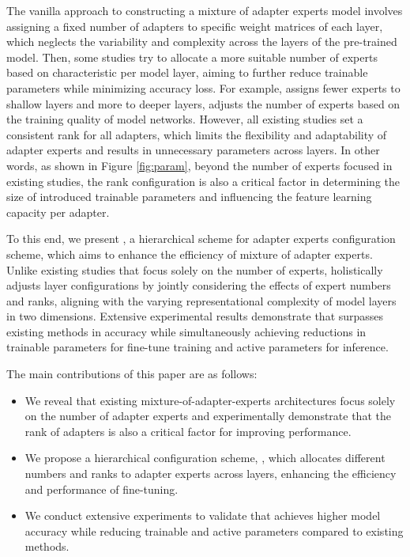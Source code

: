 The vanilla approach to constructing a mixture of adapter experts model involves assigning a fixed number of adapters to specific weight matrices of each layer, which neglects the variability and complexity across the layers of the pre-trained model. 
Then, some studies try to allocate a more suitable number of experts based on characteristic per model layer, aiming to further reduce trainable parameters while minimizing accuracy loss. 
For example, \cite{gao2024higher} assigns fewer experts to shallow layers and more to deeper layers, \cite{qing2024alphalora} adjusts the number of experts based on the training quality of model networks. 
However, all existing studies set a consistent rank for all adapters, which limits the flexibility and adaptability of adapter experts and results in unnecessary parameters across layers. 
In other words, as shown in Figure \ref{fig:param}, beyond the number of experts focused in existing studies, the rank configuration is also a critical factor in determining the size of introduced trainable parameters and influencing the feature learning capacity per adapter. 


To this end, we present \name, a hierarchical scheme for adapter experts configuration scheme, which aims to enhance the efficiency of mixture of adapter experts. Unlike existing studies that focus solely on the number of experts, \name holistically adjusts layer configurations by jointly considering the effects of expert numbers and ranks, aligning with the varying representational complexity of model layers in two dimensions. Extensive experimental results demonstrate that \name surpasses existing methods in accuracy while simultaneously achieving reductions in trainable parameters for fine-tune training and active parameters for inference. 

The main contributions of this paper are as follows:
\begin{itemize}
	\item We reveal that existing mixture-of-adapter-experts architectures focus solely on the number of adapter experts and experimentally demonstrate that the rank of adapters is also a critical factor for improving performance. 
    \item We propose a hierarchical configuration scheme, \name, which allocates different numbers and ranks to adapter experts across layers, enhancing the efficiency and performance of fine-tuning. 
    \item We conduct extensive experiments to validate that \name achieves higher model accuracy while reducing trainable and active parameters compared to existing methods.
\end{itemize}

